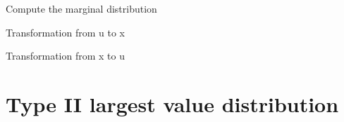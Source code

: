 \documentclass[letterpaper,10pt,english]{sphinxmanual}
\begin{document}
\begin{fulllineitems}
\begin{fulllineitems}
\end{fulllineitems}



\begin{fulllineitems}
Compute the marginal distribution

\end{fulllineitems}



\begin{fulllineitems}
Transformation from u to x

\end{fulllineitems}



\begin{fulllineitems}
Transformation from x to u

\end{fulllineitems}


\end{fulllineitems}



\section{Type II largest value distribution}
\label{distributions:type-ii-largest-value-distribution}
\end{document}
